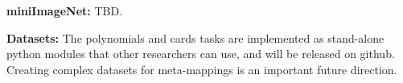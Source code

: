 \documentclass{article}
\begin{document}
{}
\textbf{miniImageNet:} TBD. \par
{}
\textbf{Datasets:} The polynomials and cards tasks are implemented as stand-alone python modules that other researchers can use, and will be released on github. Creating complex datasets for meta-mappings is an important future direction. \par
\end{document}
